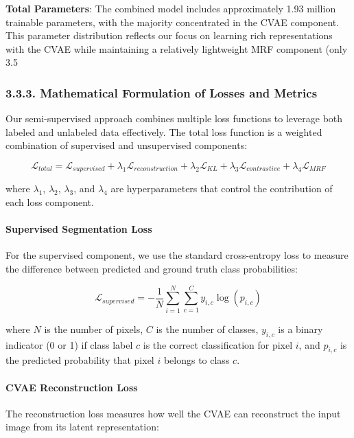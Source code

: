 \documentclass[conference]{IEEEtran}
\begin{document}
\textbf{Total Parameters}: The combined model includes approximately 1.93 million trainable parameters, with the majority concentrated in the CVAE component. This parameter distribution reflects our focus on learning rich representations with the CVAE while maintaining a relatively lightweight MRF component (only 3.5%

\subsubsection*{3.3.3. Mathematical Formulation of Losses and Metrics}

Our semi-supervised approach combines multiple loss functions to leverage both labeled and unlabeled data effectively. The total loss function is a weighted combination of supervised and unsupervised components:

\begin{equation}
\mathcal{L}_{total} = \mathcal{L}_{supervised} + \lambda_1 \mathcal{L}_{reconstruction} + \lambda_2 \mathcal{L}_{KL} + \lambda_3 \mathcal{L}_{contrastive} + \lambda_4 \mathcal{L}_{MRF}
\end{equation}

where $\lambda_1$, $\lambda_2$, $\lambda_3$, and $\lambda_4$ are hyperparameters that control the contribution of each loss component.

\paragraph{Supervised Segmentation Loss}
For the supervised component, we use the standard cross-entropy loss to measure the difference between predicted and ground truth class probabilities:

\begin{equation}
\mathcal{L}_{supervised} = -\frac{1}{N} \sum_{i=1}^{N} \sum_{c=1}^{C} y_{i,c} \log(p_{i,c})
\end{equation}

where $N$ is the number of pixels, $C$ is the number of classes, $y_{i,c}$ is a binary indicator (0 or 1) if class label $c$ is the correct classification for pixel $i$, and $p_{i,c}$ is the predicted probability that pixel $i$ belongs to class $c$.

\paragraph{CVAE Reconstruction Loss}
The reconstruction loss measures how well the CVAE can reconstruct the input image from its latent representation:
\end{document}
